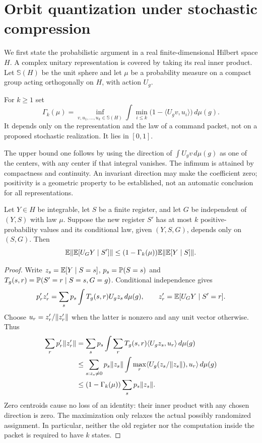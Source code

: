 \section{Orbit quantization under stochastic compression}\label{sec:packet}
We first state the probabilistic argument in a real finite-dimensional
Hilbert space $H$. A complex unitary representation is covered by taking
its real inner product. Let $\mathbb S(H)$ be the unit sphere and let
$\mu$ be a probability measure on a compact group acting orthogonally
on $H$, with action $U_g$.

\begin{definition}\label{def:distortion}
For $k\ge1$ set
\begin{equation}\label{eq:distortion}
 \Gamma_k(\mu)=\inf_{v,u_1,\ldots,u_k\in\mathbb S(H)}
  \int\min_{i\le k}\bigl(1-\langle U_gv,u_i\rangle\bigr)\,d\mu(g).
\end{equation}
It depends only on the representation and the law of a command packet,
not on a proposed stochastic realization. It lies in $[0,1]$.
\end{definition}
The upper bound one follows by using the direction of
$\int U_gv\,d\mu(g)$ as one of the centers, with any center if that
integral vanishes. The infimum is attained by compactness and continuity.
An invariant direction may make the coefficient zero; positivity is a
geometric property to be established, not an automatic conclusion for
all representations.

\begin{lemma}\label{lem:packet}
Let $Y\in H$ be integrable, let $S$ be a finite register, and let $G$
be independent of $(Y,S)$ with law $\mu$. Suppose the new register
$S'$ has at most $k$ positive-probability values and its conditional
law, given $(Y,S,G)$, depends only on $(S,G)$. Then
\begin{equation}\label{eq:packet}
 \mathbb E\lVert\mathbb E[U_GY\mid S']\rVert
 \le(1-\Gamma_k(\mu))\mathbb E\lVert\mathbb E[Y\mid S]\rVert.
\end{equation}
\end{lemma}
\begin{proof}
Write $z_s=\mathbb E[Y\mid S=s]$, $p_s=\mathbb P(S=s)$ and
$T_g(s,r)=\mathbb P(S'=r\mid S=s,G=g)$. Conditional independence gives
\[
 p'_r z'_r=\sum_s p_s\int T_g(s,r)U_gz_s\,d\mu(g),
 \qquad z'_r=\mathbb E[U_GY\mid S'=r].
\]
Choose $u_r=z'_r/\lVert z'_r\rVert$ when the latter is nonzero and any unit
vector otherwise. Thus
\begin{align*}
 \sum_r p'_r\lVert z'_r\rVert
 &=\sum_s p_s\int\sum_rT_g(s,r)\langle U_gz_s,u_r\rangle\,d\mu(g)\\
 &\le\sum_{s:z_s\ne0}p_s\lVert z_s\rVert
       \int\max_r\langle U_g(z_s/\lVert z_s\rVert),u_r\rangle\,d\mu(g)\\
 &\le (1-\Gamma_k(\mu))\sum_s p_s\lVert z_s\rVert.
\end{align*}
Zero centroids cause no loss of an identity: their inner product with
any chosen direction is zero. The maximization only relaxes the actual
possibly randomized assignment. In particular, neither the old register
nor the computation inside the packet is required to have $k$ states.
\end{proof}

